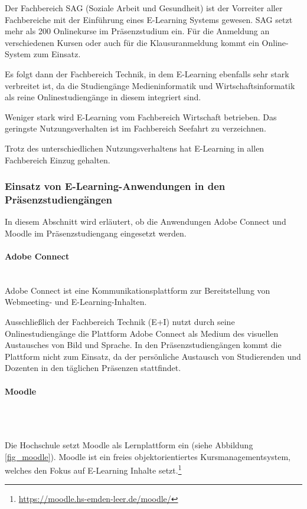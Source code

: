 Der Fachbereich SAG (Soziale Arbeit und Gesundheit) ist der Vorreiter aller Fachbereiche mit der Einführung eines E-Learning Systems gewesen. SAG setzt mehr als 200 Onlinekurse im Präsenzstudium ein. Für die Anmeldung an verschiedenen Kursen oder auch für die Klausuranmeldung kommt ein Online-System zum Einsatz.

Es folgt dann der Fachbereich Technik, in dem E-Learning ebenfalls sehr stark verbreitet ist, da die Studiengänge Medieninformatik und Wirtschaftsinformatik als reine Onlinestudiengänge in diesem integriert sind.

Weniger stark wird E-Learning vom Fachbereich Wirtschaft betrieben. Das geringste Nutzungsverhalten ist im Fachbereich Seefahrt zu verzeichnen.

Trotz des unterschiedlichen Nutzungsverhaltens hat E-Learning in allen Fachbereich Einzug gehalten.

\subsubsection[Einsatz von E-Learning-Anwendungen]{Einsatz von E-Learning-Anwendungen in den Präsenzstudiengängen}
In diesem Abschnitt wird erläutert, ob die Anwendungen Adobe Connect und Moodle im Präsenzstudiengang eingesetzt werden.

\paragraph{Adobe Connect}\mbox{} \\

Adobe Connect ist eine Kommunikationsplattform zur Bereitstellung von Webmeeting- und E-Learning-Inhalten.

Ausschließlich der Fachbereich Technik (E+I) nutzt durch seine Onlinestudiengänge die Plattform Adobe Connect als Medium des visuellen Austausches von Bild und Sprache. In den Präsenzstudiengängen kommt die Plattform nicht zum Einsatz, da der persönliche Austausch von Studierenden und Dozenten in den täglichen Präsenzen stattfindet.

\paragraph{Moodle}\mbox{}\\\\
\label{paragraph_moodle}

Die Hochschule setzt Moodle als Lernplattform ein (siehe Abbildung \ref{fig_moodle}). Moodle ist ein freies objektorientiertes Kursmanagementsystem, welches den Fokus auf E-Learning Inhalte setzt.\footnote{\url{https://moodle.hs-emden-leer.de/moodle/}}

